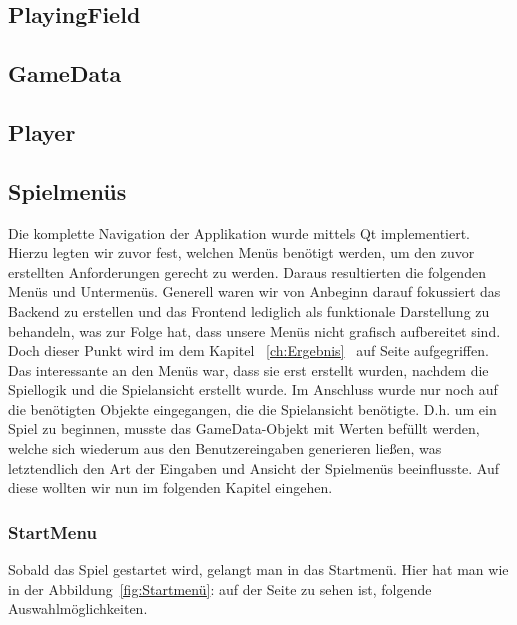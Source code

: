\documentclass[a4paper]{scrartcl}
\begin{document}
\subsection{PlayingField}\label{ch:PlayingField}
\subsection{GameData}\label{ch:GameData}
\subsection{Player}\label{ch:Player}

\subsection{Spielmenüs}\label{ch:Spielmenüs}
Die komplette Navigation der Applikation wurde mittels Qt implementiert. Hierzu legten wir zuvor fest, welchen Menüs benötigt werden, um den zuvor erstellten Anforderungen gerecht zu werden. Daraus resultierten die folgenden Menüs und Untermenüs. Generell waren wir von Anbeginn darauf fokussiert das Backend zu erstellen und das Frontend lediglich als funktionale Darstellung zu behandeln, was zur Folge hat, dass unsere Menüs nicht grafisch aufbereitet sind. Doch dieser Punkt wird im dem Kapitel ~\ref{ch:Ergebnis}  \glqq{}\grqq \ auf Seite \pageref{ch:Ergebnis} aufgegriffen.
\\
Das interessante an den Menüs war, dass sie erst erstellt wurden, nachdem die Spiellogik und die Spielansicht erstellt wurde. Im Anschluss wurde nur noch auf die benötigten Objekte eingegangen, die die Spielansicht benötigte. D.h. um ein Spiel zu beginnen, musste das GameData-Objekt mit Werten befüllt werden, welche sich wiederum aus den Benutzereingaben generieren ließen, was letztendlich den Art der Eingaben und Ansicht der Spielmenüs beeinflusste. Auf diese wollten wir nun im folgenden Kapitel eingehen.

\subsubsection{StartMenu}\label{ch:StartMenu}
Sobald das Spiel gestartet wird, gelangt man in das Startmenü. Hier hat man wie in der Abbildung~\ref{fig:Startmenü}: auf der Seite \pageref{fig:Startmenü} zu sehen ist, folgende Auswahlmöglichkeiten.
\end{document}
